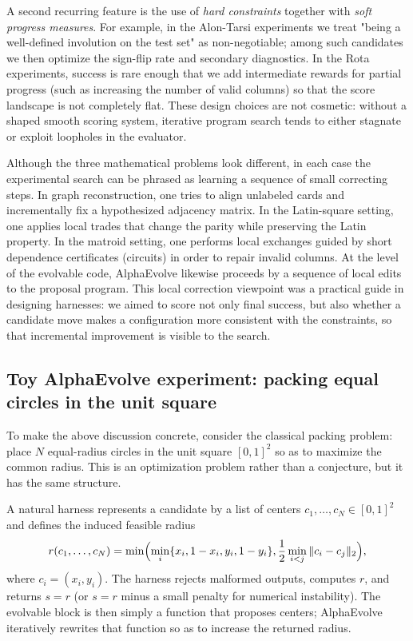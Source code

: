 \documentclass[11pt]{amsart}
\begin{document}
A second recurring feature is the use of \emph{hard constraints} together with \emph{soft progress measures}.
For example, in the Alon-Tarsi experiments we treat "being a well-defined involution on the test set" as non-negotiable; among such candidates we then optimize the sign-flip rate and secondary diagnostics.
In the Rota experiments, success is rare enough that we add intermediate rewards for partial progress (such as increasing the number of valid columns) so that the score landscape is not completely flat.
These design choices are not cosmetic: without a shaped smooth scoring system, iterative program search tends to either stagnate or exploit loopholes in the evaluator.

Although the three mathematical problems look different, in each case the experimental search can be phrased as learning a sequence of small correcting steps.
In graph reconstruction, one tries to align unlabeled cards and incrementally fix a hypothesized adjacency matrix.
In the Latin-square setting, one applies local trades that change the parity while preserving the Latin property.
In the matroid setting, one performs local exchanges guided by short dependence certificates (circuits) in order to repair invalid columns.
At the level of the evolvable code, AlphaEvolve likewise proceeds by a sequence of local edits to the proposal program.
This local correction viewpoint was a practical guide in designing harnesses: we aimed to score not only final success, but also whether a candidate move makes a configuration more consistent with the constraints, so that incremental improvement is visible to the search.

\subsection{Toy AlphaEvolve experiment: packing equal circles in the unit square}
To make the above discussion concrete, consider the classical packing problem: place $N$ equal-radius circles in the unit square $[0,1]^2$ so as to maximize the common radius.
This is an optimization problem rather than a conjecture, but it has the same structure.

A natural harness represents a candidate by a list of centers $c_1,\dots,c_{N}\in[0,1]^2$ and defines the induced feasible radius
\[
r(c_1,\dots,c_{N}) = \min\Bigl( \min_{i}\{x_i,1-x_i,y_i,1-y_i\},\frac12\min_{i<j}\|c_i-c_j\|_2 \Bigr),
\]
where $c_i=(x_i,y_i)$.
The harness rejects malformed outputs, computes $r$, and returns $s=r$ (or $s=r$ minus a small penalty for numerical instability).
The evolvable block is then simply a function that proposes centers; AlphaEvolve iteratively rewrites that function so as to increase the returned radius.
\end{document}
